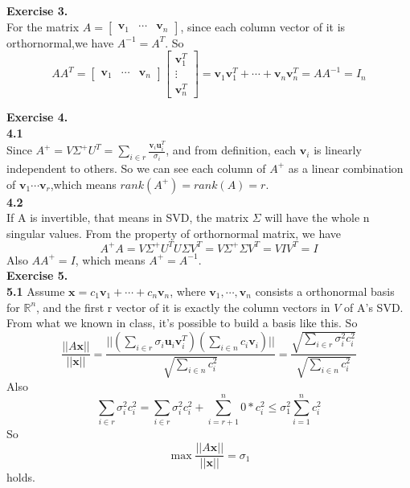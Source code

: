\documentclass{article}
\begin{document}
\textbf{Exercise 3.}\\

For the matrix $A=\begin{bmatrix}
    \mathbf{v}_1&\cdots&\mathbf{v}_n
\end{bmatrix}$, since each column vector of it is orthornormal,we have $A^{-1}=A^T$.
So \[
AA^T=\begin{bmatrix}
    \mathbf{v}_1&\cdots&\mathbf{v}_n
\end{bmatrix}\begin{bmatrix}
    \mathbf{v}_1^T\\\vdots\\\mathbf{v}_n^T
\end{bmatrix}=\mathbf{v}_1\mathbf{v}_1^T+\cdots+\mathbf{v}_n\mathbf{v}_n^T=AA^{-1}=I_n
\]

\textbf{Exercise 4.}\\

\textbf{4.1}\\

Since $A^+=V\Sigma^+U^T=\sum_{i\in r}\frac{\mathbf{v}_i\mathbf{u}_i^T}{\sigma_i}$, and from definition, each $\mathbf{v}_i$ is linearly independent to others. So we can see each column of $A^+$ as a linear combination of $\mathbf{v}_1\cdots\mathbf{v}_r$,which means $rank(A^+)=rank(A)=r$.\\

\textbf{4.2}\\

If A is invertible, that means in SVD, the matrix $\Sigma$ will have the whole n singular values. From the property of orthornormal matrix, we have
\[
A^+A=V\Sigma^+U^TU\Sigma V^T=V\Sigma^+\Sigma V^T=VIV^T=I
\]
Also $AA^+=I$, which means $A^+=A^{-1}$.\\

\textbf{Exercise 5.}\\

\textbf{5.1} Assume $\mathbf{x}=c_1\mathbf{v}_1+\cdots+c_n\mathbf{v}_n$, where $\mathbf{v}_1,\cdots, \mathbf{v}_n$ consists a orthonormal basis for $\mathbb{R}^n$, and the first r vector of it is exactly the column vectors in $V$ of A's SVD.
 From what we known in class, it's possible to build a basis like this. So
 \[
 \frac{||A\mathbf{x}||}{||\mathbf{x}||}=\frac{||(\sum_{i \in r}\sigma_i\mathbf{u}_i\mathbf{v}_i^T)(\sum_{i\in n}c_i\mathbf{v}_i)||}{\sqrt{\sum_{i \in n}c_i^2}}=\frac{\sqrt{\sum_{i\in r}\sigma_i^2c_i^2}}{\sqrt{\sum_{i \in n}c_i^2}}
 \]
Also \[
  \sum_{i\in r}\sigma_i^2c_i^2= \sum_{i \in r}\sigma_i^2c_i^2+\sum_{i=r+1}^{n}0*c_i^2\leq \sigma_1^2\sum_{i=1}^{n}c_i^2
\]
So \[
\max \frac{||A\mathbf{x}||}{||\mathbf{x}||}=\sigma_1
\]
holds.\\
\end{document}
